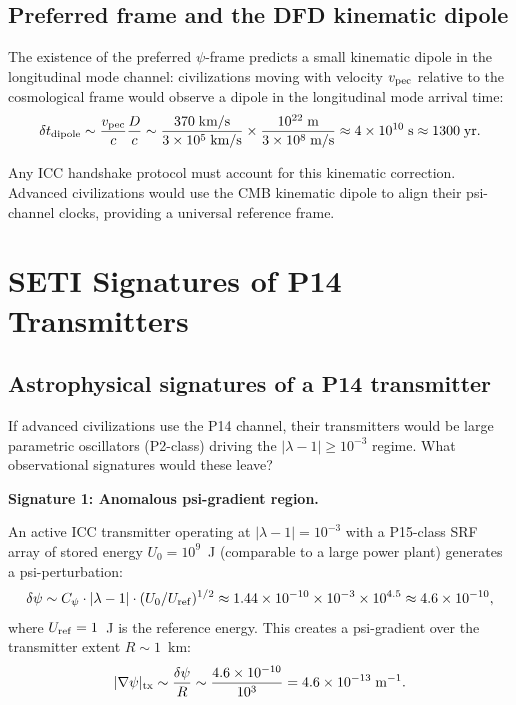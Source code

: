 \documentclass[11pt]{article}
\newcommand{\ee}[1]{\times 10^{#1}}
\begin{document}
\subsection{Preferred frame and the DFD kinematic dipole}

The existence of the preferred $\psi$-frame predicts a small
kinematic dipole in the longitudinal mode channel: civilizations
moving with velocity $v_{\rm pec}$ relative to the cosmological
frame would observe a dipole in the longitudinal mode arrival
time:
\begin{equation}
\delta t_{\rm dipole} \sim \frac{v_{\rm pec}}{c} \frac{D}{c}
\sim \frac{370\;\text{km/s}}{3\ee{5}\;\text{km/s}} \times \frac{10^{22}\;\text{m}}{3\ee{8}\;\text{m/s}}
\approx 4\ee{10}\;\text{s} \approx 1300\;\text{yr}.
\end{equation}

Any ICC handshake protocol must account for this kinematic correction.
Advanced civilizations would use the CMB kinematic dipole to align
their psi-channel clocks, providing a universal reference frame.

\section{SETI Signatures of P14 Transmitters}
\label{sec:SETI}

\subsection{Astrophysical signatures of a P14 transmitter}

If advanced civilizations use the P14 channel, their transmitters
would be large parametric oscillators (P2-class) driving the
$|\lambda-1| \geq 10^{-3}$ regime. What observational signatures
would these leave?

\textbf{Signature 1: Anomalous psi-gradient region.}

An active ICC transmitter operating at $|\lambda-1| = 10^{-3}$ with
a P15-class SRF array of stored energy $U_0 = 10^9$~J (comparable
to a large power plant) generates a psi-perturbation:
\begin{equation}
\delta\psi \sim C_\psi \cdot |\lambda-1| \cdot (U_0/U_{\rm ref})^{1/2}
\approx 1.44\ee{-10} \times 10^{-3} \times 10^{4.5}
\approx 4.6\ee{-10},
\end{equation}
where $U_{\rm ref} = 1$~J is the reference energy. This creates
a psi-gradient over the transmitter extent $R \sim 1$~km:
\begin{equation}
|\nabla\psi|_{\rm tx} \sim \frac{\delta\psi}{R} \sim \frac{4.6\ee{-10}}{10^3} = 4.6\ee{-13}\;\text{m}^{-1}.
\end{equation}
\end{document}
